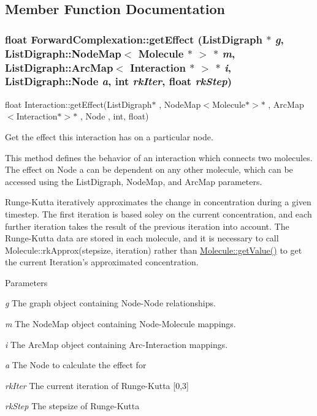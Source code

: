 \subsection{Member Function Documentation}
\hypertarget{classForwardComplexation_a8f7f867b98b484ed0f09192ebd280e1a}{
\subsubsection[{getEffect}]{\setlength{\rightskip}{0pt plus 5cm}float ForwardComplexation::getEffect (ListDigraph $\ast$ {\em g}, \/  ListDigraph::NodeMap$<$ {\bf Molecule} $\ast$ $>$ $\ast$ {\em m}, \/  ListDigraph::ArcMap$<$ {\bf Interaction} $\ast$ $>$ $\ast$ {\em i}, \/  ListDigraph::Node {\em a}, \/  int {\em rkIter}, \/  float {\em rkStep})}}
\label{classForwardComplexation_a8f7f867b98b484ed0f09192ebd280e1a}
float Interaction::getEffect(ListDigraph$\ast$ , NodeMap$<$Molecule$\ast$$>$$\ast$ , ArcMap$<$Interaction$\ast$$>$$\ast$ , Node , int, float)

Get the effect this interaction has on a particular node.

This method defines the behavior of an interaction which connects two molecules. The effect on Node a can be dependent on any other molecule, which can be accessed using the ListDigraph, NodeMap, and ArcMap parameters.

Runge-\/Kutta iteratively approximates the change in concentration during a given timestep. The first iteration is based soley on the current concentration, and each further iteration takes the result of the previous iteration into account. The Runge-\/Kutta data are stored in each molecule, and it is necessary to call Molecule::rkApprox(stepsize, iteration) rather than \hyperlink{classMolecule_a554ea822918374775d5f52b5d49d8195}{Molecule::getValue()} to get the current Iteration's approximated concentration.


\begin{DoxyParams}{Parameters}
\item[{\em g}]The graph object containing Node-\/Node relationships. \item[{\em m}]The NodeMap object containing Node-\/Molecule mappings. \item[{\em i}]The ArcMap object containing Arc-\/Interaction mappings. \item[{\em a}]The Node to calculate the effect for \item[{\em rkIter}]The current iteration of Runge-\/Kutta \mbox{[}0,3\mbox{]} \item[{\em rkStep}]The stepsize of Runge-\/Kutta \end{DoxyParams}


